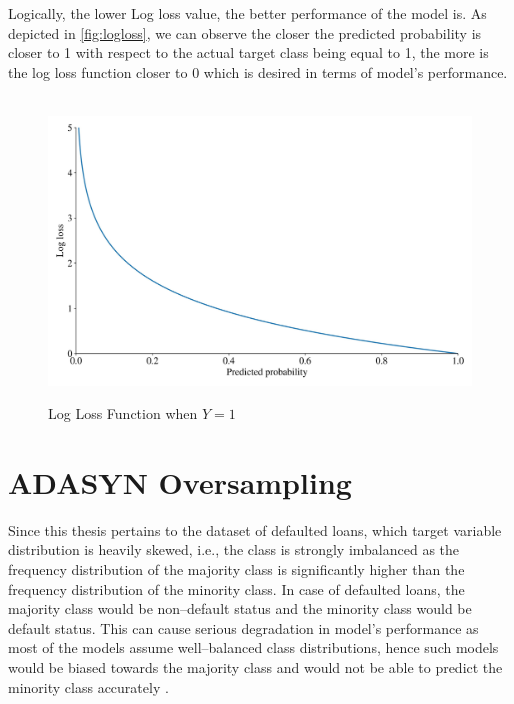 Logically, the lower Log loss value, the better performance of the model is. As depicted in \autoref{fig:logloss}, we can observe the closer the predicted probability is closer to 1 with respect to the actual target class being equal to 1, the more is the log loss function closer to 0 which is desired in terms of model's performance.
\begin{figure}[H]
    \centering
    \caption{Log Loss Function when $Y=1$}\vspace{0.5em}
    \label{fig:logloss}\
    \includegraphics[width=130mm]{Figures/logloss.jpg}
    \vspace{-1em}
\end{figure}



\section{ADASYN Oversampling}
\label{sec:adasyntheory}
Since this thesis pertains to the dataset of defaulted loans, which target variable distribution is heavily skewed, i.e., the class is strongly imbalanced as the frequency distribution of the majority class is significantly higher than the frequency distribution of the minority class. In case of defaulted loans, the majority class would be non--default status and the minority class would be default status.
This can cause serious degradation in model's performance as most of the models assume well--balanced class distributions, hence such models would be biased towards the majority class and would not be able to predict the minority class accurately \citep{prati2009data}.

